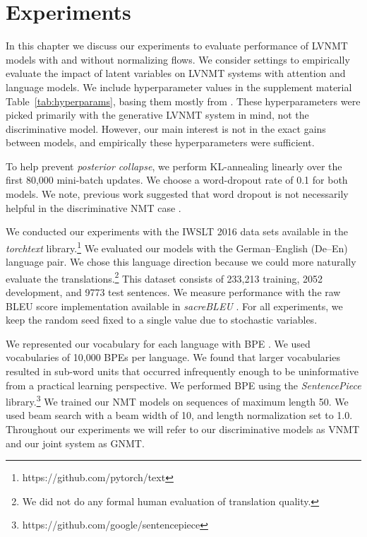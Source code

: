 \chapter{Experiments}

In this chapter we discuss our experiments to evaluate performance of \ac{LVNMT} models with and without normalizing flows. We consider settings to empirically evaluate the impact of latent variables on \ac{LVNMT} systems with attention and language models. We include hyperparameter values in the supplement material Table~\ref{tab:hyperparams}, basing them mostly from \citet{eikema2018AEVNMT}. These hyperparameters were picked primarily with the generative \ac{LVNMT} system in mind, not the discriminative model. However, our main interest is not in the exact gains between models, and empirically these hyperparameters were sufficient.

To help prevent \textit{posterior collapse}, we perform KL-annealing linearly over the first 80,000 mini-batch updates. We choose a word-dropout rate of 0.1 for both models. We note, previous work suggested that word dropout is not necessarily helpful in the discriminative \ac{NMT} case \cite{harshil2018GNMT}. %

We conducted our experiments with the IWSLT 2016 data sets available in the \textit{torchtext} library.\footnote{https://github.com/pytorch/text} We evaluated our models with the German--English (De--En) language pair. We chose this language direction because we could more naturally evaluate the translations.\footnote{ We did not do any formal human evaluation of translation quality.} This dataset consists of 233,213 training, 2052 development, and 9773 test sentences. We measure performance with the raw BLEU score implementation available in \textit{sacreBLEU} \cite{post2018SacreBLEU}. For all experiments, we keep the random seed fixed to a single value due to stochastic variables. %

We represented our vocabulary for each language with \ac{BPE} \cite{sennrich2015NMTRarwordsBPE}. We used vocabularies of 10,000 \ac{BPE}s per language. We found that larger vocabularies resulted in sub-word units that occurred infrequently enough to be uninformative from a practical learning perspective. We performed \ac{BPE} using the \textit{SentencePiece} library.\footnote{https://github.com/google/sentencepiece} We trained our \ac{NMT} models on sequences of maximum length 50. We used beam search with a beam width of 10, and length normalization set to 1.0. Throughout our experiments we will refer to our discriminative models as \ac{VNMT} and our joint system as \ac{GNMT}. %


